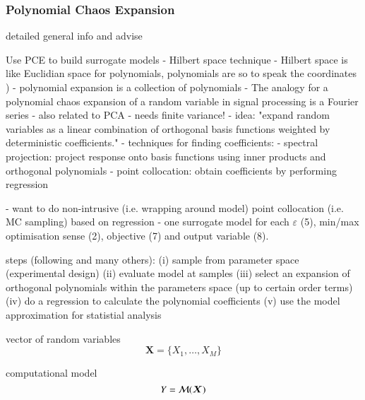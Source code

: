 \subsubsection{Polynomial Chaos Expansion}

detailed general info and advise
\cite{gratiet_metamodel-based_2015} 
\cite{sudret_global_2008}
\cite{fajraoui_optimal_2017}
\cite{marelli_uqlab_nodate}

Use PCE to build surrogate models \cite{sudret_global_2008}
- Hilbert space technique 
- Hilbert space is like Euclidian space for polynomials, polynomials are so to speak the coordinates \cite{gratiet_metamodel-based_2015})
- polynomial expansion is a collection of polynomials
- The analogy for a polynomial chaos expansion of a random variable in signal processing is a Fourier series \cite{muhlpfordt_uncertainty_2020}
- also related to PCA
- needs finite variance!
- idea: "expand random variables as a linear combination of orthogonal basis functions weighted by deterministic coefficients." \cite{muhlpfordt_uncertainty_2020}
- techniques for finding coefficients:
  - spectral projection: project response onto basis functions using inner products and orthogonal polynomials \cite{palar_multi-fidelity_2016}
  - point collocation: obtain coefficients by performing regression \cite{palar_multi-fidelity_2016,fajraoui_optimal_2017}

- want to do non-intrusive (i.e. wrapping around model) point collocation (i.e. MC sampling) based on regression \cite{ng_multifidelity_2012}
- one surrogate model for each $\varepsilon$ (5), min/max optimisation sense (2), objective (7) and output variable (8).

steps (following \cite{feinberg_chaospy_2015} and many others):
(i) sample from parameter space (experimental design)
(ii) evaluate model at samples
(iii) select an expansion of orthogonal polynomials within the parameters space (up to certain order terms)
(iv) do a regression to calculate the polynomial coefficients
(v) use the model approximation for statistial analysis


vector of random variables
\begin{equation}
    \bm{X} = \{X_1, \dots , X_M\}
\end{equation}

computational model
\begin{equation}
    Y = \mathcal{M} ( \bm X )
\end{equation}

